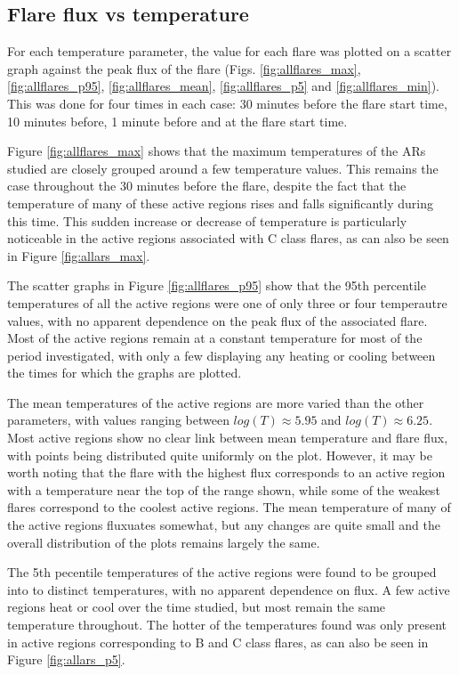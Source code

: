 \documentclass[referee,a4paper,12pt]{swsc}
\begin{document}
\begin{linenumbers}
\subsection{Flare flux vs temperature}
For each temperature parameter, the value for each flare was plotted on a scatter graph against the peak flux of the flare (Figs. \ref{fig:allflares_max}, \ref{fig:allflares_p95}, \ref{fig:allflares_mean}, \ref{fig:allflares_p5} and \ref{fig:allflares_min}).
This was done for four times in each case: 30 minutes before the flare start time, 10 minutes before, 1 minute before and at the flare start time.

Figure \ref{fig:allflares_max} shows that the maximum temperatures of the ARs studied are closely grouped around a few temperature values.
This remains the case throughout the 30 minutes before the flare, despite the fact that the temperature of many of these active regions rises and falls significantly during this time.
This sudden increase or decrease of temperature is particularly noticeable in the active regions associated with C class flares, as can also be seen in Figure \ref{fig:allars_max}.

The scatter graphs in Figure \ref{fig:allflares_p95} show that the 95th percentile temperatures of all the active regions were one of only three or four temperautre values, with no apparent dependence on the peak flux of the associated flare. Most of the active regions remain at a constant temperature for most of the period investigated, with only a few displaying any heating or cooling between the times for which the graphs are plotted.

The mean temperatures of the active regions are more varied than the other parameters, with values ranging between $log(T) \approx 5.95$ and $log(T) \approx 6.25$. 
Most active regions show no clear link between mean temperature and flare flux, with points being distributed quite uniformly on the plot.
However, it may be worth noting that the flare with the highest flux corresponds to an active region with a temperature near the top of the range shown, while some of the weakest flares correspond to the coolest active regions.
The mean temperature of many of the active regions fluxuates somewhat, but any changes are quite small and the overall distribution of the plots remains largely the same.

The 5th pecentile temperatures of the active regions were found to be grouped into to distinct temperatures, with no apparent dependence on flux.
A few active regions heat or cool over the time studied, but most remain the same temperature throughout.
The hotter of the temperatures found was only present in active regions corresponding to B and C class flares, as can also be seen in Figure \ref{fig:allars_p5}.


\end{linenumbers}
\end{document}
